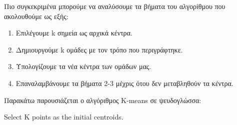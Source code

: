 Πιο συγκεκριμένα μπορούμε να αναλύσουμε τα βήματα του αλγορίθμου που ακολουθούμε ως εξής:
\begin{enumerate}
    \item Επιλέγουμε k σημεία ως αρχικά κέντρα.
    \item Δημιουργούμε k ομάδες με τον τρόπο που περιγράφτηκε.
    \item Υπολογίζουμε τα νέα κέντρα των ομάδων μας.
    \item Επαναλαμβάνουμε τα βήματα 2-3 μέχρις ότου δεν μεταβληθούν τα κέντρα.
\end{enumerate}

Παρακάτω παρουσιάζεται ο αλγόριθμος K-means σε ψευδογλώσσα:\\
\noindent\begin{minipage}{0.9\linewidth}
\centering
\begin{algorithm}[H]
    Select K points as the initial centroids.\;
\end{algorithm}
\end{minipage}

